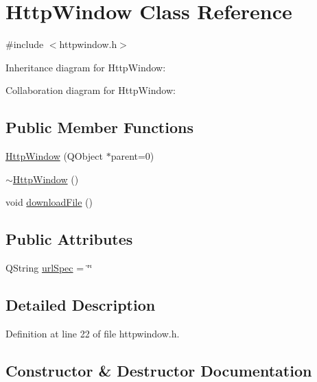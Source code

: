 \hypertarget{classHttpWindow}{}\section{Http\+Window Class Reference}
\label{classHttpWindow}


{\ttfamily \#include $<$httpwindow.\+h$>$}



Inheritance diagram for Http\+Window\+:


Collaboration diagram for Http\+Window\+:
\subsection*{Public Member Functions}
\begin{DoxyCompactItemize}
\item 
\hyperlink{classHttpWindow_aa06dc84217e45ab0bfaba7e4ab03d027}{Http\+Window} (Q\+Object $\ast$parent=0)
\item 
\hyperlink{classHttpWindow_ab8366665996f36800cef89d64cd08041}{$\sim$\+Http\+Window} ()
\item 
void \hyperlink{classHttpWindow_ab0f982da3e2d49cdf92cbb203819f153}{download\+File} ()
\end{DoxyCompactItemize}
\subsection*{Public Attributes}
\begin{DoxyCompactItemize}
\item 
Q\+String \hyperlink{classHttpWindow_aa6f089df1046cf5e824dee5ecd8d448a}{url\+Spec} = \char`\"{}\char`\"{}
\end{DoxyCompactItemize}


\subsection{Detailed Description}


Definition at line 22 of file httpwindow.\+h.



\subsection{Constructor \& Destructor Documentation}
\mbox{\label{classHttpWindow_aa06dc84217e45ab0bfaba7e4ab03d027}} 
